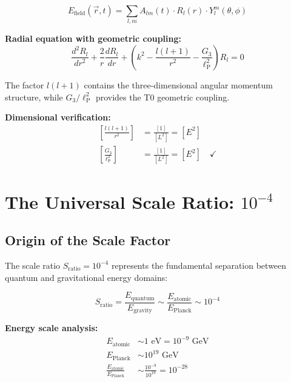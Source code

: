 \documentclass[12pt,a4paper]{report}
\newcommand{\lP}{\ell_{\text{P}}}         %
\begin{document}
	\begin{equation}
		E_{\text{field}}(\vec{r}, t) = \sum_{l,m} A_{lm}(t) \cdot R_l(r) \cdot Y_l^m(\theta, \phi)
	\end{equation}
	
	\textbf{Radial equation with geometric coupling:}
	\begin{equation}
		\frac{d^2 R_l}{dr^2} + \frac{2}{r}\frac{dR_l}{dr} + \left(k^2 - \frac{l(l+1)}{r^2} - \frac{G_3}{\lP^2}\right) R_l = 0
	\end{equation}
	
	The factor $l(l+1)$ contains the three-dimensional angular momentum structure, while $G_3/\lP^2$ provides the T0 geometric coupling.
	
	\textbf{Dimensional verification:}
	\begin{align}
		\left[\frac{l(l+1)}{r^2}\right] &= \frac{[1]}{[L^2]} = [E^2] \\
		\left[\frac{G_3}{\lP^2}\right] &= \frac{[1]}{[L^2]} = [E^2] \quad \checkmark
	\end{align}
	
	\section{The Universal Scale Ratio: $10^{-4}$}
	\label{sec:universal_scale_ratio}
	
	\subsection{Origin of the Scale Factor}
	\label{subsec:origin_scale_factor}
	
	The scale ratio $S_{\text{ratio}} = 10^{-4}$ represents the fundamental separation between quantum and gravitational energy domains:
	
	\begin{equation}
		S_{\text{ratio}} = \frac{E_{\text{quantum}}}{E_{\text{gravity}}} \sim \frac{E_{\text{atomic}}}{E_{\text{Planck}}} \sim 10^{-4}
	\end{equation}
	
	\textbf{Energy scale analysis:}
	\begin{align}
		E_{\text{atomic}} &\sim 1 \text{ eV} = 10^{-9} \text{ GeV} \\
		E_{\text{Planck}} &\sim 10^{19} \text{ GeV} \\
		\frac{E_{\text{atomic}}}{E_{\text{Planck}}} &\sim \frac{10^{-9}}{10^{19}} = 10^{-28}
	\end{align}
	
\end{document}
